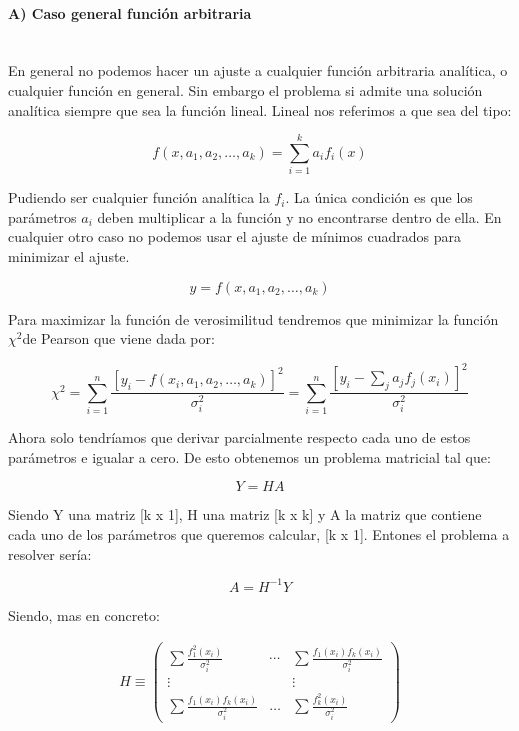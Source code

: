 \documentclass[12pt,a4paper]{book}
\newcommand{\chii}{$\chi^2$}
\begin{document}
\paragraph{A) Caso general función arbitraria \\ \\}

En general no podemos hacer un ajuste a cualquier función arbitraria analítica, o cualquier función en general. Sin embargo el problema si admite una solución analítica siempre que sea la función lineal. Lineal nos referimos a que sea del tipo:

\begin{equation}
f(x,a_1,a_2,\ldots,a_k) = \sum_{i=1}^k a_i f_i(x)
\end{equation}

Pudiendo ser cualquier función analítica la $f_i$. La única condición es que los parámetros $a_i$ deben multiplicar a la función y no encontrarse dentro de ella. En cualquier otro caso no podemos usar el ajuste de mínimos cuadrados para minimizar el ajuste.

\begin{equation}
y = f(x,a_1,a_2,\ldots,a_k)
\end{equation}

Para maximizar la función de verosimilitud tendremos que minimizar la función \chii de Pearson que viene dada por:

\begin{equation}
\chi^2 = \sum_{i=1}^n \dfrac{[y_i - f(x_i,a_1,a_2,\ldots,a_k)]^2}{\sigma_i^2} = \sum_{i=1}^n \dfrac{\left[ y_i - \sum_{j} a_jf_j(x_i)\right]^2}{\sigma_i^2}
\end{equation}

Ahora solo tendríamos que derivar parcialmente respecto cada uno de estos parámetros e igualar a cero. De esto obtenemos un problema matricial tal que:

\begin{equation}
Y = H A
\end{equation}

Siendo Y una matriz [k x 1], H una matriz [k x k] y A la matriz que contiene cada uno de los parámetros que queremos calcular, [k x 1]. Entones el problema a resolver sería:

\begin{equation}
A = H^{-1} Y
\end{equation}

Siendo, mas en concreto:

\begin{gather}
H \equiv \left( 
\begin{array}{lll}
\sum \frac{f_1^2 (x_i)}{\sigma_i^2} & \cdots & \sum \frac{f_1  (x_i)f_k(x_i)}{\sigma_i^2} \\
\vdots & & \vdots \\
\sum \frac{f_1  (x_i)f_k(x_i)}{\sigma_i^2}  & \ldots & \sum \frac{f_k^2 (x_i)}{\sigma_i^2}
\end{array}
\right)
\end{gather}
\end{document}
